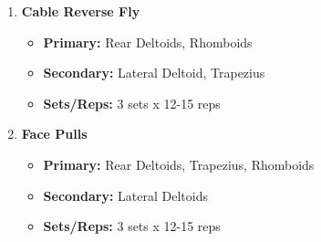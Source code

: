 \documentclass{article}
\begin{document}
\begin{enumerate}[label=\arabic*., wide=0pt, leftmargin=*]
    \item \textbf{Cable Reverse Fly}
        \begin{itemize}[label=\textbullet, leftmargin=*, nosep, topsep=0pt, partopsep=0pt]
            \item \textbf{Primary:} Rear Deltoids, Rhomboids
            \item \textbf{Secondary:} Lateral Deltoid, Trapezius
            \item \textbf{Sets/Reps:} 3 sets x 12-15 reps
        \end{itemize}

    \item \textbf{Face Pulls}
        \begin{itemize}[label=\textbullet, leftmargin=*, nosep, topsep=0pt, partopsep=0pt]
            \item \textbf{Primary:} Rear Deltoids, Trapezius, Rhomboids
            \item \textbf{Secondary:} Lateral Deltoids
            \item \textbf{Sets/Reps:} 3 sets x 12-15 reps
        \end{itemize}
\end{enumerate}
\end{document}
